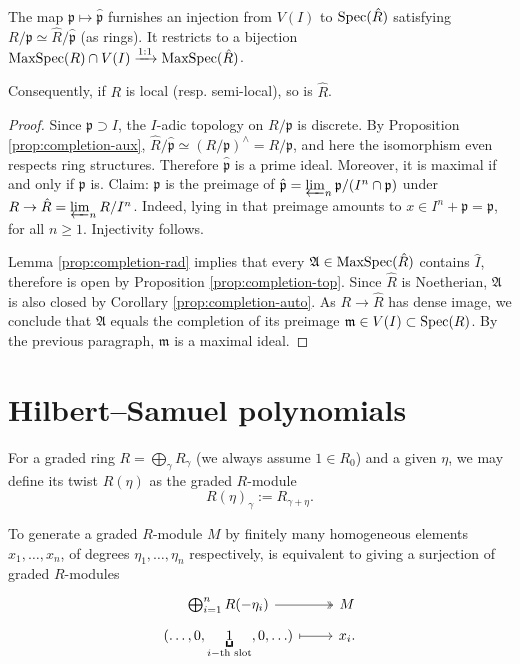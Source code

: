 \begin{proposition}\label{prop:completion-semilocal}
	The map $\mathfrak{p} \mapsto \hat{\mathfrak{p}}$ furnishes an injection from $V(I)$ to $\operatorname{Spec}(\hat{R})$ satisfying $R/\mathfrak{p} \simeq \hat{R}/\hat{\mathfrak{p}}$ (as rings). It restricts to a bijection $\operatorname{MaxSpec}(R) \cap V(I) \xrightarrow{1:1} \operatorname{MaxSpec}(\hat{R})$.

	Consequently, if $R$ is local (resp. semi-local), so is $\hat{R}$.
\end{proposition}
\begin{proof}
	Since $\mathfrak{p} \supset I$, the $I$-adic topology on $R/\mathfrak{p}$ is discrete. By Proposition \ref{prop:completion-aux}, $\hat{R}/\hat{\mathfrak{p}} \simeq (R/\mathfrak{p})^\wedge = R/\mathfrak{p}$, and here the isomorphism even respects ring structures. Therefore $\hat{\mathfrak{p}}$ is a prime ideal. Moreover, it is maximal if and only if $\mathfrak{p}$ is. Claim: $\mathfrak{p}$ is the preimage of $\hat{\mathfrak{p}} = \varprojlim_n \mathfrak{p}/(I^n \cap \mathfrak{p})$ under $R \to \hat{R} = \varprojlim_n R/I^n$. Indeed, lying in that preimage amounts to $x \in I^n + \mathfrak{p} = \mathfrak{p}$, for all $n \geq 1$. Injectivity follows.

	Lemma \ref{prop:completion-rad} implies that every $\mathfrak{A} \in \operatorname{MaxSpec}(\hat{R})$ contains $\hat{I}$, therefore is open by Proposition \ref{prop:completion-top}. Since $\hat{R}$ is Noetherian, $\mathfrak{A}$ is also closed by Corollary \ref{prop:completion-auto}. As $R \to \hat{R}$ has dense image, we conclude that $\mathfrak{A}$ equals the completion of its preimage $\mathfrak{m} \in V(I) \subset \operatorname{Spec}(R)$. By the previous paragraph, $\mathfrak{m}$ is a maximal ideal.
\end{proof}

\section{Hilbert--Samuel polynomials}
For a graded ring $R = \bigoplus_\gamma R_\gamma$ (we always assume $1 \in R_0$) and a given $\eta$, we may define its twist $R(\eta)$ as the graded $R$-module
\[ R(\eta)_\gamma := R_{\gamma+\eta}. \]

To generate a graded $R$-module $M$ by finitely many homogeneous elements $x_1, \ldots, x_n$, of degrees $\eta_1, \ldots, \eta_n$ respectively, is equivalent to giving a surjection of graded $R$-modules
\begin{equation}\label{eqn:homogeneous-generation} \begin{tikzcd}[row sep=tiny]
	\bigoplus_{i=1}^n R(-\eta_i) \arrow[r, twoheadrightarrow] & M \\
	(\ldots, 0, \underbracket{1}_{i-\text{th slot}}, 0, \ldots) \arrow[r, mapsto] & x_i.
\end{tikzcd}\end{equation}

